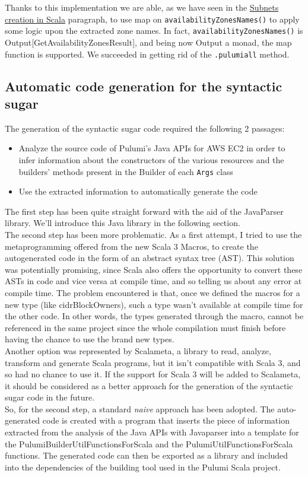 Thanks to this implementation we are able, as we have seen in the \hyperref[sssec:subnets-creation]{Subnets creation in Scala} paragraph, to use map on \texttt{availabilityZonesNames()} to apply some logic upon the extracted zone names.
In fact, \texttt{availabilityZonesNames()} is Output[GetAvailabilityZonesResult], and being now Output a monad, the map function is supported.
We succeeded in getting rid of the \texttt{.pulumiall} method.

\subsection{Automatic code generation for the syntactic sugar}
The generation of the syntactic sugar code required the following 2 passages:
\begin{itemize}
  \item Analyze the source code of Pulumi's Java APIs for AWS EC2 in order to infer information about the constructors of the various resources and the builders' methods present in the Builder of each \texttt{Args} class
  \item Use the extracted information to automatically generate the code
\end{itemize}
The first step has been quite straight forward with the aid of the JavaParser library.
We'll introduce this Java library in the following section.\\
The second step has been more problematic.
As a first attempt, I tried to use the metaprogramming offered from the new Scala 3 Macros, to create the autogenerated code in the form of an \gls{abstract syntax tree} (AST).
This solution was potentially promising, since Scala also offers the opportunity to convert these ASTs in code and vice versa at compile time, and so telling us about any error at compile time.
The problem encountered is that, once we defined the macros for a new type (like cidrBlockOwners), such a type wasn't available at compile time for the other code.
In other words, the types generated through the macro, cannot be referenced in the same project since the whole compilation must finish before having the chance to use the brand new types.\\
Another option was represented by Scalameta, a library to read, analyze, transform and generate Scala programs, but it isn't compatible with Scala 3, and so had no chance to use it.
If the support for Scala 3 will be added to Scalameta, it should be considered as a better approach for the generation of the syntactic sugar code in the future.\\
So, for the second step, a standard \textit{naive} approach has been adopted.
The auto-generated code is created with a program that inserts the piece of information extracted from the analysis of the Java APIs with Javaparser into a template for the PulumiBuilderUtilFunctionsForScala and the PulumiUtilFunctionsForScala functions.
The generated code can then be exported as a library and included into the dependencies of the building tool used in the Pulumi Scala project.

